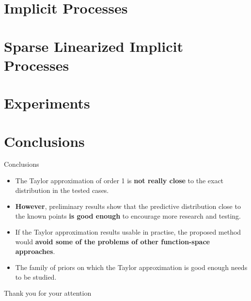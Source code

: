 \documentclass[10pt, aspectratio=149]{beamer}
\begin{document}
\section{Implicit Processes}


\section{Sparse Linearized Implicit Processes}


\section{Experiments}



\section{Conclusions}
\begin{frame}{Conclusions}
    \begin{itemize}[<+->]
    \item The Taylor approximation of order 1 is \textbf{not really close} to the exact distribution in the tested cases.
    \item \textbf{However}, preliminary results show that the predictive distribution close to the known points \textbf{is good enough} to encourage more research and testing.
    \item If the Taylor approximation results usable in practise, the proposed method would \textbf{avoid some of the problems of other function-space approaches}.
    \item The family of priors on which the Taylor approximation is good enough needs to be studied.
    \end{itemize}
\end{frame}

\begin{frame}[standout]
  Thank you for your attention
\end{frame}
\end{document}
